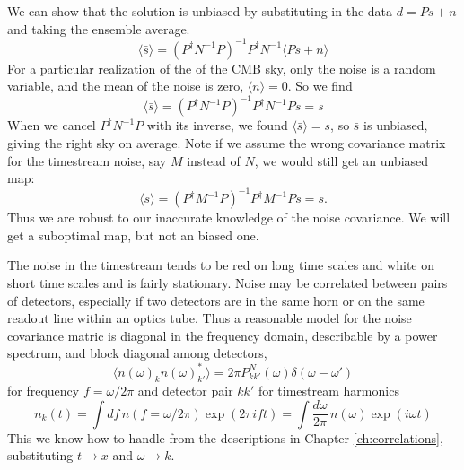 We can show that the solution is unbiased by substituting in the data $d = Ps +n$ and taking the ensemble average.
\begin{equation}
\langle \bar s \rangle = (P^\dag N^{-1}P)^{-1} P^\dag N^{-1} \langle Ps + n \rangle
\end{equation}
For a particular realization of the of the CMB sky, only the noise is a random variable, and the mean of the noise is zero, $\langle n \rangle = 0$.  So we find
\begin{equation}
\langle \bar s \rangle = (P^\dag N^{-1}P)^{-1} P^\dag N^{-1} P s = s
\end{equation}
When we cancel $P^\dag N^{-1} P$ with its inverse, we found $\langle \bar s \rangle = s$, so $\bar s$ is unbiased, giving the right sky on average.  Note if we assume the wrong covariance matrix for the timestream noise, say $M$ instead of $N$, we would still get an unbiased map:
\begin{equation}
\langle \bar s \rangle = (P^\dag M^{-1}P)^{-1} P^\dag M^{-1} P s = s.
\end{equation}
Thus we are robust to our inaccurate knowledge of the noise covariance.  We will get a suboptimal map, but not an biased one.

The noise in the timestream tends to be red on long time scales and white on short time scales and is fairly stationary.  Noise may be correlated between pairs of detectors, especially if two detectors are in the same horn or on the same readout line within an optics tube. Thus a reasonable model for the noise covariance matric is diagonal in the frequency domain, describable by a power spectrum, and block diagonal among detectors,
\begin{equation}
  \langle n(\omega)_k n(\omega)_{k'}^*  \rangle = 2\pi P^N_{kk'}(\omega) \delta(\omega - \omega') 
\end{equation}
for frequency $f = \omega/2\pi$ and detector pair $kk'$  for timestream harmonics
\begin{equation}
n_k(t) = \int df\, n(f = \omega/2\pi) \exp(2\pi i ft) = \int \frac{d\omega}{2\pi}\, n(\omega) \exp(i \omega t)
\end{equation}
This we know how to handle from the descriptions in Chapter \ref{ch:correlations}, substituting $t \rightarrow x$ and $\omega \rightarrow k$.

